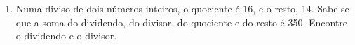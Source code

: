 \documentclass[a4paper,14pt]{article}
\begin{document}
\begin{multicols}{2}
\begin{enumerate}
			\item Numa diviso de dois números inteiros, o quociente é 16, e o resto, 14. Sabe-se que a soma do dividendo, do divisor, do quociente e do resto é 350. Encontre o dividendo e o divisor.
    	\end{enumerate}
    $~$ \\ $~$ \\ $~$ \\ $~$ \\ $~$ \\ $~$ \\ $~$ \\ $~$ \\ $~$ \\
    \end{multicols}
\end{document}
